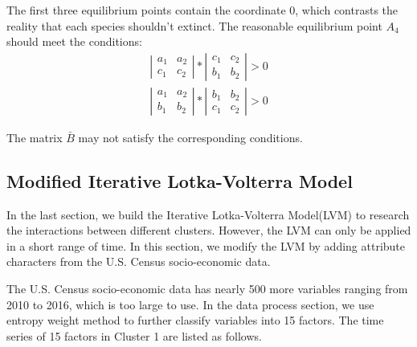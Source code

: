 \documentclass[12pt]{article}
\begin{document}
The first three equilibrium points contain the coordinate 0, which contrasts the reality that each species shouldn't extinct. The reasonable equilibrium point $A_{4}$ should meet the conditions:
\begin{gather*}
	\left \vert 
	\begin{matrix}
		a_{1} & a_{2} \\
		c_{1} & c_{2} 
	\end{matrix}
	\right \vert
	\ast
	\left \vert
	\begin{matrix}
		c_{1} & c_{2} \\
		b_{1} & b_{2}
	\end{matrix}
	\right \vert
	> 0 \\
	\left \vert 
	\begin{matrix}
		a_{1} & a_{2} \\
		b_{1} & b_{2} 
	\end{matrix}
	\right \vert
	\ast
	\left \vert
	\begin{matrix}
		b_{1} & b_{2} \\
		c_{1} & c_{2}
	\end{matrix}
	\right \vert
	> 0
\end{gather*}

The matrix $\bar B$ may not satisfy the corresponding conditions.

\subsection{Modified Iterative Lotka-Volterra Model}
In the last section, we build the Iterative Lotka-Volterra Model(LVM) to research the interactions between different clusters. However, the LVM can only be applied in a short range of time. In this section, we modify the LVM by adding attribute characters from the U.S. Census socio-economic data.

The U.S. Census socio-economic data has nearly 500 more variables ranging from 2010 to 2016, which is too large to use. In the data process section, we use entropy weight method to further classify variables into 15 factors. The time series of 15 factors in Cluster 1 are listed as follows.
\end{document}
